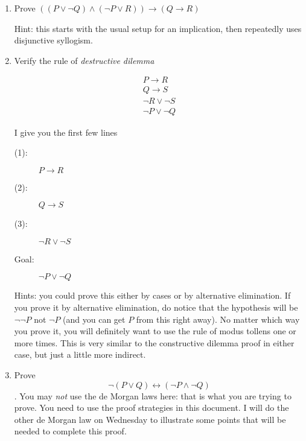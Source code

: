 \documentclass[12pt]{article}
\begin{document}
\begin{enumerate}

\item Prove $((P \vee \neg Q) \wedge (\neg P \vee R)) \rightarrow (Q \rightarrow R)$

Hint:  this starts with the usual setup for an implication, then repeatedly uses disjunctive syllogism.

\item Verify the rule of {\em destructive dilemma\/}

$$\begin{array}{c}

P \rightarrow R\\

Q \rightarrow S \\

\neg R \vee \neg S \\ \hline

\neg P \vee \neg Q

\end{array}$$

I give you the first few lines

\begin{description}

\item[(1):]  $P \rightarrow R$

\item[(2):]  $Q \rightarrow S$

\item[(3):]  $\neg R \vee \neg S$

\item[Goal:]  $\neg P \vee \neg Q$

\end{description}

Hints:  you could prove this either by cases or by alternative elimination.  If you prove it by alternative elimination, do notice
that the hypothesis will be $\neg\neg P$ not $\neg P$ (and you can get $P$ from this right away).  No matter which way you prove it,
you will definitely want to use the rule of modus tollens one or more times.  This is very similar to the constructive dilemma proof in either case, but just a little more indirect.

\item  Prove $$\neg(P \vee Q) \leftrightarrow (\neg P \wedge \neg Q)$$.  You may {\em not\/} use the de Morgan laws here:  that is what you are trying to prove.  You need to use the proof strategies in this document.  I will do the other de Morgan law on Wednesday to illustrate some points that will be needed to complete this proof.


\end{enumerate}
\end{document}
